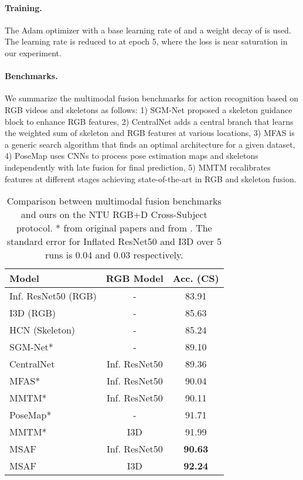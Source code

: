 \documentclass[10pt,twocolumn,letterpaper]{article}
\begin{document}
\paragraph{Training.}
The Adam optimizer with a base learning rate of  and a weight decay of  is used. The learning rate is reduced to  at epoch 5, where the loss is near saturation in our experiment. 

\paragraph{Benchmarks.}
We summarize the multimodal fusion benchmarks for action recognition based on RGB videos and skeletons as follows: 1) SGM-Net \cite{li2020sgm} proposed a skeleton guidance block to enhance RGB features, 2) CentralNet \cite{vielzeuf2018centralnet} adds a central branch that learns the weighted sum of skeleton and RGB features at various locations, 3) MFAS \cite{Perez-Rua_2019_CVPR} is a generic search algorithm that finds an optimal architecture for a given dataset, 4) PoseMap \cite{liu2018recognizing} uses CNNs to process pose estimation maps and skeletons independently with late fusion for final prediction, 5) MMTM \cite{joze2020mmtm} recalibrates features at different stages achieving state-of-the-art in RGB and skeleton fusion.

\begin{table}[t]
  \centering
  \small
    \begin{tabular}{lcc} Model & RGB Model & Acc. (CS)\\
      \hline
      Inf. ResNet50 (RGB) & - & 83.91 \\
      I3D (RGB) & - & 85.63 \\
      HCN (Skeleton)& - & 85.24 \\
      \hline
      SGM-Net* & - & 89.10 \\
      CentralNet & Inf. ResNet50 & 89.36 \\
      MFAS* & Inf. ResNet50 & 90.04 \\
      MMTM* & Inf. ResNet50 & 90.11 \\
      PoseMap* & - & 91.71 \\
      MMTM* & I3D & 91.99 \\
      \hline
      \multirow{1}{*}{MSAF} & \multirow{1}{*}{Inf. ResNet50} & \textbf{90.63}\\
      \multirow{1}{*}{MSAF} & \multirow{1}{*}{I3D} & \textbf{92.24}\\
      \hline
    \end{tabular}
    \caption{Comparison between multimodal fusion benchmarks and ours on the NTU RGB+D Cross-Subject protocol. * from original papers and  from \cite{joze2020mmtm}. The standard error for Inflated ResNet50 and I3D over 5 runs is 0.04 and 0.03 respectively.}
    \label{table3}
\end{table}
\end{document}

